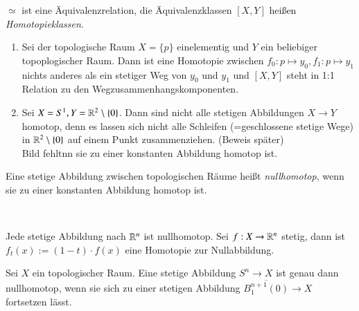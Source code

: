 \documentclass[a4paper,10pt]{scrartcl}
\begin{document}
$\simeq$ ist eine Äquivalenzrelation, die Äquivalenzklassen $[X,Y]$ heißen \emph{Homotopieklassen}.  
\begin{exs*}
 \begin{enumerate}
  \item Sei der topologische Raum $X=\{p\}$ einelementig und $Y$ ein beliebiger topoplogischer Raum.  Dann ist eine Homotopie zwischen $f_0: p\mapsto y_0, f_1: p\mapsto y_1$ nichts anderes als ein stetiger Weg von $y_0$ und $y_1$ und $[X,Y]$ steht in 1:1 Relation zu den Wegzusammenhangskomponenten.
  \item Sei $X=S^1, Y=\mathbb{R}^2\setminus \{0\}$. Dann sind nicht alle stetigen Abbildungen $X\to Y$ homotop, denn es lassen sich nicht alle Schleifen (=geschlossene stetige Wege) in $\mathbb{R}^2\setminus\{0\}$   auf einem Punkt zusammenziehen. (Beweis später)
\fixme[fig40]\\Bild fehltnn sie zu einer konstanten Abbildung homotop ist.  
\end{enumerate}
\end{exs*}
\begin{df}
 Eine stetige Abbildung zwischen topologischen Räume heißt \emph{nullhomotop}, wenn sie zu einer konstanten Abbildung homotop ist. 
\end{df}
\fixme[fig41]\\
\begin{ex*}
 Jede stetige Abbildung nach $\mathbb{R}^n$ ist nullhomotop. Sei $f: X\to \mathbb{R}^n$ stetig, dann ist $f_t(x):= (1-t)\cdot f(x)$ eine Homotopie zur Nullabbildung. 
\end{ex*}
\begin{st}
 Sei $X$ ein topologischer Raum.  Eine stetige Abbildung $S^n\to X$ ist genau dann nullhomotop, wenn sie sich zu einer stetigen Abbildung $\overline{B_1^{n+1}(0)}\to X$ fortsetzen lässt.
\end{st}
\end{document}
